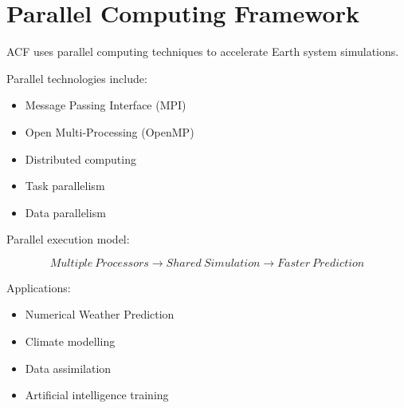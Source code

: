 \section{Parallel Computing Framework}


ACF uses parallel computing techniques to accelerate
Earth system simulations.



Parallel technologies include:


\begin{itemize}

\item Message Passing Interface (MPI)

\item Open Multi-Processing (OpenMP)

\item Distributed computing

\item Task parallelism

\item Data parallelism

\end{itemize}



Parallel execution model:


\[
Multiple\ Processors
\rightarrow
Shared\ Simulation
\rightarrow
Faster\ Prediction
\]


Applications:


\begin{itemize}

\item Numerical Weather Prediction

\item Climate modelling

\item Data assimilation

\item Artificial intelligence training

\end{itemize}

